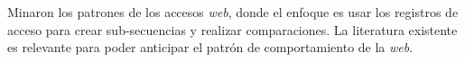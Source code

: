 Minaron los patrones de los accesos \emph{web}, donde el enfoque es usar los registros de acceso para crear sub-secuencias y realizar comparaciones.
La literatura existente es relevante para poder anticipar el patrón de comportamiento de la \emph{web}.
